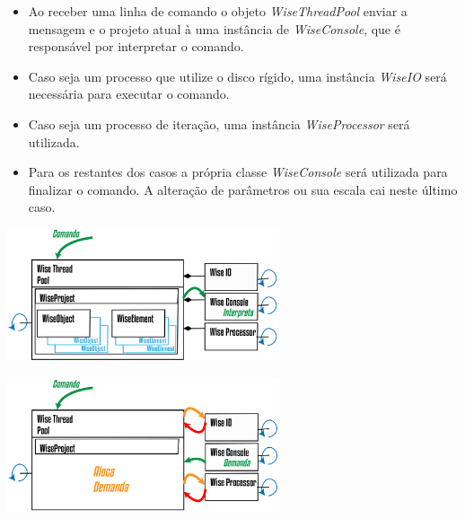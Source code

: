 \documentclass[10pt,aspectratio=169]{beamer}
\theoremstyle{remark}
\theoremstyle{definition}
\begin{document}
\begin{frame}[allowframebreaks]
\begin{center}
		\end{center}
		
		\framebreak

	\begin{itemize}
			\item Ao receber uma linha de comando o objeto \textit{WiseThreadPool} enviar a mensagem e o projeto atual à uma instância de \textit{WiseConsole}, que é responsável por interpretar o comando.
			\item Caso seja um processo que utilize o disco rígido, uma instância \textit{WiseIO} será necessária para executar o comando. 
			\item Caso seja um processo de iteração, uma instância \textit{WiseProcessor} será utilizada.
			\item Para os restantes dos casos a própria classe \textit{WiseConsole} será utilizada para finalizar o comando. A alteração de parâmetros ou sua escala cai neste último caso.
		\end{itemize}		
		
		\begin{center}
			
			\item \includegraphics[width=0.6\textwidth]{Figures/WiseThreaPoolCMD@16x.png}
			
		\end{center}
		
		\framebreak
		\begin{center}
			
			\item \includegraphics[width=0.6\textwidth]{Figures/WiseThreaPoolCMDSub@16x.png}
			
		\end{center}
		

\end{frame}
\end{document}
